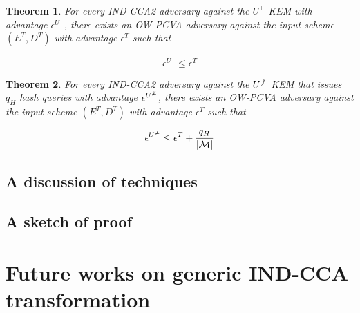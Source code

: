 \documentclass{article}
\newcommand{\norm}[1]{\vert {#1} \vert}
\newtheorem{theorem}{Theorem}[section]
\begin{document}
\begin{theorem}
    For every IND-CCA2 adversary against the $U^\bot$ KEM with advantage $\epsilon^{U^\bot}$, there exists an OW-PCVA adversary against the input scheme $(E^T, D^T)$ with advantage $\epsilon^T$ such that

    \begin{equation*}
        \epsilon^{U^\bot} \leq \epsilon^T
    \end{equation*}
\end{theorem}

\begin{theorem}
    For every IND-CCA2 adversary against the $U^{\not\bot}$ KEM that issues $q_H$ hash queries with advantage $\epsilon^{U^{\not\bot}}$, there exists an OW-PCVA adversary against the input scheme $(E^T, D^T)$ with advantage $\epsilon^T$ such that

    \begin{equation*}
        \epsilon^{U^{\not\bot}} \leq \epsilon^T + \frac{q_H}{\norm{\mathcal{M}}}
    \end{equation*}
\end{theorem}

\subsection{A discussion of techniques}

\subsection{A sketch of proof}

\section{Future works on generic IND-CCA transformation}



\end{document}
